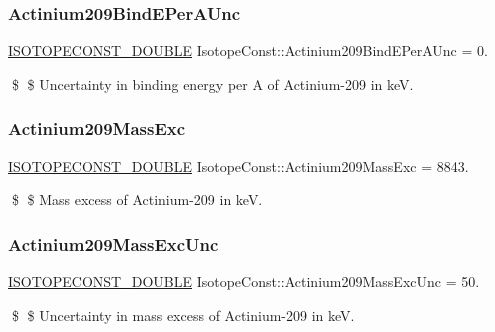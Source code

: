 \subsubsection{\texorpdfstring{Actinium209\+Bind\+E\+Per\+A\+Unc}{Actinium209BindEPerAUnc}}
{\footnotesize\ttfamily \mbox{\hyperlink{group___isotope_const-_macros_ga8f45a7272ce02c0b4c65c44636ed719a}{I\+S\+O\+T\+O\+P\+E\+C\+O\+N\+S\+T\+\_\+\+D\+O\+U\+B\+LE}} Isotope\+Const\+::\+Actinium209\+Bind\+E\+Per\+A\+Unc = 0.}

\$ \$ Uncertainty in binding energy per A of Actinium-\/209 in keV. \mbox{\label{group___isotope_const-_actinium-_ac209_ga9e7c50af5b80062c038f52805f46bdc5}} 
\subsubsection{\texorpdfstring{Actinium209\+Mass\+Exc}{Actinium209MassExc}}
{\footnotesize\ttfamily \mbox{\hyperlink{group___isotope_const-_macros_ga8f45a7272ce02c0b4c65c44636ed719a}{I\+S\+O\+T\+O\+P\+E\+C\+O\+N\+S\+T\+\_\+\+D\+O\+U\+B\+LE}} Isotope\+Const\+::\+Actinium209\+Mass\+Exc = 8843.}

\$ \$ Mass excess of Actinium-\/209 in keV. \mbox{\label{group___isotope_const-_actinium-_ac209_ga2c646cde494adca0f138877fb400e49b}} 
\subsubsection{\texorpdfstring{Actinium209\+Mass\+Exc\+Unc}{Actinium209MassExcUnc}}
{\footnotesize\ttfamily \mbox{\hyperlink{group___isotope_const-_macros_ga8f45a7272ce02c0b4c65c44636ed719a}{I\+S\+O\+T\+O\+P\+E\+C\+O\+N\+S\+T\+\_\+\+D\+O\+U\+B\+LE}} Isotope\+Const\+::\+Actinium209\+Mass\+Exc\+Unc = 50.}

\$ \$ Uncertainty in mass excess of Actinium-\/209 in keV. \mbox{\label{group___isotope_const-_actinium-_ac209_gaa674ca398914c47484caeee5ff81a41c}} 
